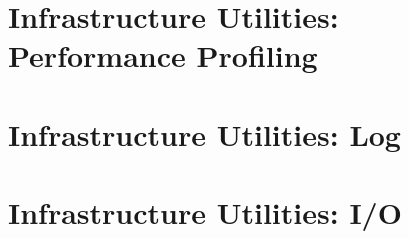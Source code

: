 \documentclass[english]{article}
\newcommand{\shortname}{GR}
\begin{document}

\newpage
\begin{htmlonly}
\end{htmlonly}
\part{Infrastructure Utilities: Performance Profiling}

\setcounter{section}{0}
\renewcommand{\thesection}{\shortname\arabic{section}}
\renewcommand{\thesubsection}{\shortname\arabic{section}.\arabic{subsection}}
\renewcommand{\thesubsubsection}{\shortname\arabic{section}.\arabic{subsection}.\arabic{subsubsection}}



\newpage
\begin{htmlonly}
\end{htmlonly}
\part{Infrastructure Utilities: Log}

\setcounter{section}{0}
\renewcommand{\thesection}{\shortname\arabic{section}}
\renewcommand{\thesubsection}{\shortname\arabic{section}.\arabic{subsection}}
\renewcommand{\thesubsubsection}{\shortname\arabic{section}.\arabic{subsection}.\arabic{subsubsection}}



\newpage
\begin{htmlonly}
\end{htmlonly}
\part{Infrastructure Utilities: I/O}
\label{part:Infrastructure Utilities:_I/O}

\setcounter{section}{0}
\renewcommand{\thesection}{\shortname\arabic{section}}
\renewcommand{\thesubsection}{\shortname\arabic{section}.\arabic{subsection}}
\renewcommand{\thesubsubsection}{\shortname\arabic{section}.\arabic{subsection}.\arabic{subsubsection}}


\end{document}
